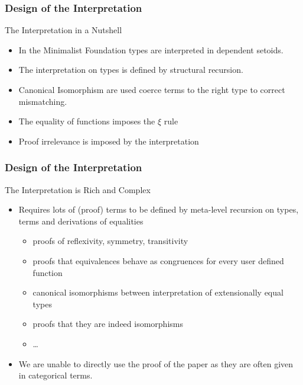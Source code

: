 \documentclass{beamer}
\begin{document}
\begin{frame}\frametitle{Design of the Interpretation}
\begin{block}{The Interpretation in a Nutshell}
\begin{itemize}
	\item In the Minimalist Foundation types are interpreted in dependent setoids.
	\item The interpretation on types is defined by structural recursion.
	\item Canonical Isomorphism are used coerce terms to the right type to correct mismatching.
        \item The equality of functions imposes the $\xi$ rule
        \item Proof irrelevance is imposed by the interpretation
\end{itemize}
\end{block}
\end{frame}

\begin{frame}\frametitle{Design of the Interpretation}
\begin{block}{The Interpretation is Rich and Complex}
\begin{itemize}
        \item Requires lots of (proof) terms to be defined by meta-level
         recursion on types, terms and derivations of equalities
         \begin{itemize}
          \item proofs of reflexivity, symmetry, transitivity
          \item proofs that equivalences behave as congruences for every user defined function
          \item canonical isomorphisms between interpretation of extensionally
           equal types
          \item proofs that they are indeed isomorphisms
          \item \ldots
         \end{itemize}
     	 \item We are unable to directly use the proof of the paper as they are often given in categorical terms.
\end{itemize}
\end{block}
\end{frame}
\end{document}
